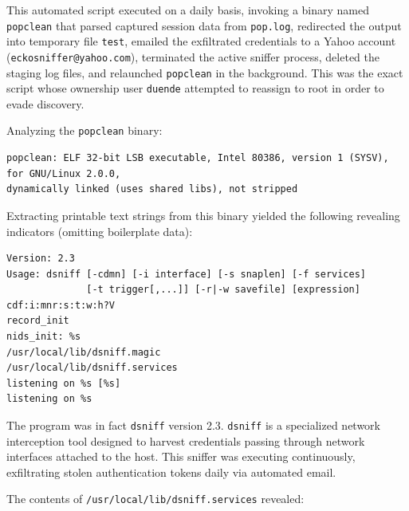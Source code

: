 \vspace{1em}

This automated script executed on a daily basis, invoking a binary named \texttt{popclean} that parsed captured session data from \texttt{pop.log}, redirected the output into temporary file \texttt{test}, emailed the exfiltrated credentials to a Yahoo account (\texttt{eckosniffer@yahoo.com}), terminated the active sniffer process, deleted the staging log files, and relaunched \texttt{popclean} in the background. This was the exact script whose ownership user \texttt{duende} attempted to reassign to root in order to evade discovery.

Analyzing the \texttt{popclean} binary:

\vspace{1em}

\begin{lstlisting}[style=terminal]
popclean: ELF 32-bit LSB executable, Intel 80386, version 1 (SYSV), for GNU/Linux 2.0.0, 
dynamically linked (uses shared libs), not stripped
\end{lstlisting}

\vspace{1em}

Extracting printable text strings from this binary yielded the following revealing indicators (omitting boilerplate data):

\vspace{1em}

\begin{lstlisting}[style=terminal]
Version: 2.3
Usage: dsniff [-cdmn] [-i interface] [-s snaplen] [-f services]
              [-t trigger[,...]] [-r|-w savefile] [expression]
cdf:i:mnr:s:t:w:h?V
record_init
nids_init: %s
/usr/local/lib/dsniff.magic
/usr/local/lib/dsniff.services
listening on %s [%s]
listening on %s
\end{lstlisting}

\vspace{1em}

The program was in fact \texttt{dsniff} version 2.3. \texttt{dsniff} is a specialized network interception tool designed to harvest credentials passing through network interfaces attached to the host. This sniffer was executing continuously, exfiltrating stolen authentication tokens daily via automated email.

The contents of \texttt{/usr/local/lib/dsniff.services} revealed:

\vspace{1em}

